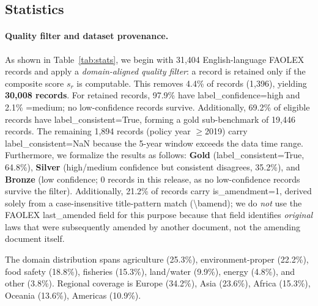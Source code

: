\documentclass[11pt]{article}
\begin{document}
\subsection{Statistics}
\label{sec:stats}

\paragraph{Quality filter and dataset provenance.}
As shown in Table~\ref{tab:stats}, we begin with 31{,}404 English-language FAOLEX records and apply a \textit{domain-aligned quality filter}: a record is retained only if the composite score $s_r$ is computable. This removes 4.4\% of records (1{,}396), yielding \textbf{30{,}008 records}. For retained records, 97.9\% have label\_confidence=high and 2.1\% =medium; no low-confidence records survive. Additionally, 69.2\% of eligible records have label\_consistent=True, forming a gold sub-benchmark of 19{,}446 records. The remaining 1{,}894 records (policy year $\ge$2019) carry label\_consistent=NaN because the 5-year window exceeds the data time range. Furthermore, we formalize the results as follows: \textbf{Gold} (label\_consistent=True, 64.8\%), \textbf{Silver} (high/medium confidence but consistent disagrees, 35.2\%), and \textbf{Bronze} (low confidence; 0 records in this release, as no low-confidence records survive the filter). Additionally, 21.2\% of records carry is\_amendment=1,
derived solely from a case-insensitive title-pattern match (\textbackslash bamend); we do \emph{not} use the FAOLEX last\_amended field for this purpose because that field identifies \emph{original} laws that were subsequently amended by another document, not the amending document itself.  

The domain distribution spans agriculture (25.3\%), environment-proper (22.2\%), food safety (18.8\%), fisheries (15.3\%), land/water (9.9\%), energy (4.8\%), and other (3.8\%). Regional coverage is Europe (34.2\%), Asia (23.6\%), Africa (15.3\%), Oceania (13.6\%), Americas (10.9\%).
\end{document}

